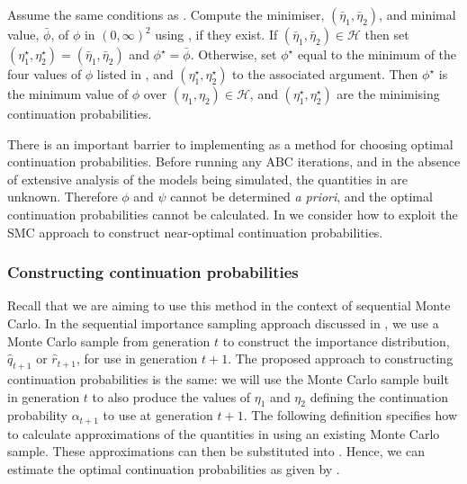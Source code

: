 \documentclass[review]{siamonline190516}
\begin{document}
\begin{proposition}
\label{etastar}
 Assume the same conditions as . 
 Compute the minimiser, $(\bar \eta_1, \bar \eta_2)$, and minimal value, $\bar \phi$, of $\phi$ in $(0,\infty)^2$ using , if they exist.
 If $(\bar \eta_1, \bar \eta_2) \in \mathcal H$ then set $(\eta_1^\star, \eta_2^\star) = (\bar \eta_1, \bar \eta_2)$ and $\phi^\star = \bar \phi$. 
 Otherwise, set $\phi^\star$ equal to the minimum of the four values of $\phi$ listed in , and $(\eta_1^\star, \eta_2^\star)$ to the associated argument.
Then $\phi^\star$ is the minimum value of $\phi$ over $(\eta_1, \eta_2) \in \mathcal H$, and $(\eta_1^\star, \eta_2^\star)$ are the minimising continuation probabilities.
\end{proposition}

There is an important barrier to implementing  as a method for choosing optimal continuation probabilities.
Before running any ABC iterations, and in the absence of extensive analysis of the models being simulated, the quantities in  are unknown.
Therefore $\phi$ and $\psi$ cannot be determined \emph{a priori}, and the optimal continuation probabilities cannot be calculated.
In  we consider how to exploit the SMC approach to construct near-optimal continuation probabilities. 

\subsubsection{Constructing continuation probabilities}
\label{s:eta:MC}

Recall that we are aiming to use this method in the context of sequential Monte Carlo.
In the sequential importance sampling approach discussed in , we use a Monte Carlo sample from generation $t$ to construct the importance distribution, $\hat q_{t+1}$ or $\hat r_{t+1}$, for use in generation $t+1$.
The proposed approach to constructing continuation probabilities is the same: we will use the Monte Carlo sample built in generation $t$ to also produce the values of $\eta_1$ and $\eta_2$ defining the continuation probability $\alpha_{t+1}$ to use at generation $t+1$.
The following definition specifies how to calculate approximations of the quantities in  using an existing Monte Carlo sample.
These approximations can then be substituted into .
Hence, we can estimate the optimal continuation probabilities as given by .
\end{document}
